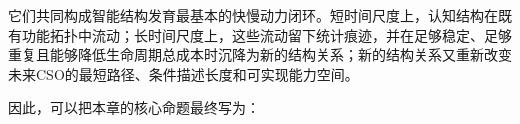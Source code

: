 它们共同构成智能结构发育最基本的快慢动力闭环。短时间尺度上，认知结构在既有功能拓扑中流动；长时间尺度上，这些流动留下统计痕迹，并在足够稳定、足够重复且能够降低生命周期总成本时沉降为新的结构关系；新的结构关系又重新改变未来CSO的最短路径、条件描述长度和可实现能力空间。

因此，可以把本章的核心命题最终写为：

\begin{statementbox}
\centering
{}
\end{statementbox}
